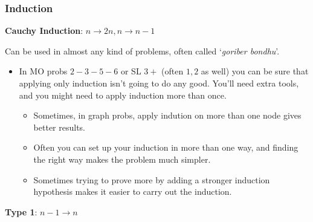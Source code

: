 	\Faka\subsubsection{Induction}{\textbf{Cauchy Induction}: $ n \rightarrow 2n, n \rightarrow n-1 $ }\label{induction}


		Can be used in almost any kind of problems, often called `\textit{goriber bondhu}'.

		\begin{itemize}

			\item In MO probs $ 2-3-5-6 $ or SL $ 3+ $ (often $ 1, 2 $ as well) you can be sure that applying only induction isn't going to do any good. You'll need extra tools, and you might need to apply induction more than once.

			\begin{itemize}

				\item Sometimes, in graph probs, apply indution on more than one node gives better results.
				\item Often you can set up your induction in more than one way, and finding the right way makes the problem much simpler.
				\item Sometimes trying to prove more by adding a stronger induction hypothesis makes it easier to carry out the induction.

			\end{itemize}

		\end{itemize}


	\faka\textbf{Type 1}: $ n-1 \rightarrow n $

